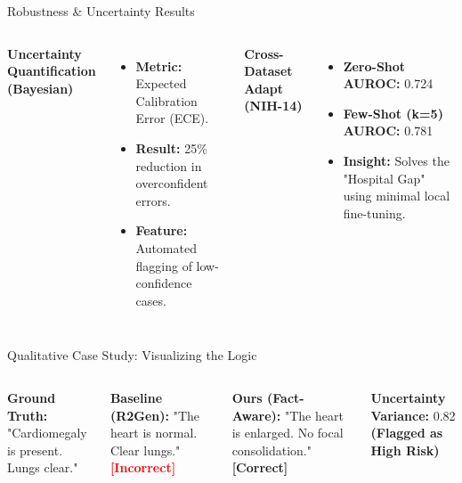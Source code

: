 \documentclass[aspectratio=169]{beamer}
\begin{document}
\begin{frame}{Robustness & Uncertainty Results}
  \begin{columns}
    \textbf{Uncertainty Quantification (Bayesian)}
    \begin{itemize}
      \item \textbf{Metric:} Expected Calibration Error (ECE).
      \item \textbf{Result:} 25\% reduction in overconfident errors.
      \item \textbf{Feature:} Automated flagging of low-confidence cases.
    \end{itemize}
    \textbf{Cross-Dataset Adapt (NIH-14)}
    \begin{itemize}
      \item \textbf{Zero-Shot AUROC:} 0.724
      \item \textbf{Few-Shot (k=5) AUROC:} 0.781
      \item \textbf{Insight:} Solves the "Hospital Gap" using minimal local fine-tuning.
    \end{itemize}
  \end{columns}
\end{frame}

\begin{frame}{Qualitative Case Study: Visualizing the Logic}
  \begin{columns}
      
      \small
      \textbf{Ground Truth:} "Cardiomegaly is present. Lungs clear."
      \vspace{0.2cm}
      
      \textbf{Baseline (R2Gen):} "The heart is normal. Clear lungs." \textcolor{red}{\textbf{[Incorrect]}}
      \vspace{0.2cm}
      
      \textbf{Ours (Fact-Aware):} "The heart is enlarged. No focal consolidation." \textcolor{green!60!black}{\textbf{[Correct]}}
      
      \vspace{0.3cm}
      \textbf{Uncertainty Variance:} 0.82 \textbf{(Flagged as High Risk)}
  \end{columns}
\end{frame}

\end{document}
